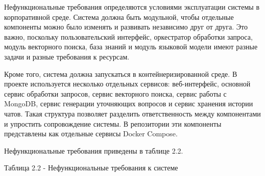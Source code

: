 \documentclass[14pt,a4paper]{extarticle}
\renewcommand{\textbf}[1]{#1}
\numberwithin{figure}{section}
\numberwithin{table}{section}
\begin{document}
Нефункциональные требования определяются условиями эксплуатации системы
в корпоративной среде. Система должна быть модульной, чтобы отдельные
компоненты можно было изменять и развивать независимо друг от друга. Это
важно, поскольку пользовательский интерфейс, оркестратор обработки
запроса, модуль векторного поиска, база знаний и модуль языковой модели
имеют разные задачи и разные требования к ресурсам.

Кроме того, система должна запускаться в контейнеризированной среде. В
проекте используется несколько отдельных сервисов: веб-интерфейс,
основной сервис обработки запросов, сервис векторного поиска, сервис
работы с MongoDB, сервис генерации уточняющих вопросов и сервис хранения
истории чатов. Такая структура позволяет разделить ответственность между
компонентами и упростить сопровождение системы. В репозитории эти
компоненты представлены как отдельные сервисы Docker Compose.

Нефункциональные требования приведены в таблице 2.2.

\textbf{Таблица 2.2 - Нефункциональные требования к системе}
\end{document}
